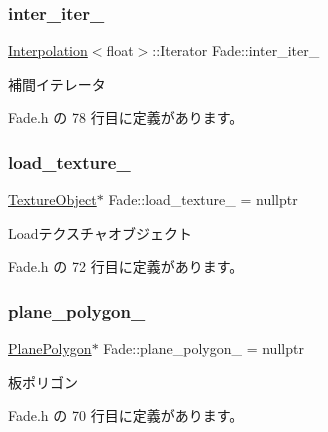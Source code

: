 \subsubsection{\texorpdfstring{inter\+\_\+iter\+\_\+}{inter\_iter\_}}
{\footnotesize\ttfamily \mbox{\hyperlink{class_interpolation}{Interpolation}}$<$float$>$\+::Iterator Fade\+::inter\+\_\+iter\+\_\+\hspace{0.3cm}{\ttfamily [private]}}



補間イテレータ 



 Fade.\+h の 78 行目に定義があります。

\mbox{\label{class_fade_a5bdc7ea6de7666601fa363e503ccc181}} 
\subsubsection{\texorpdfstring{load\+\_\+texture\+\_\+}{load\_texture\_}}
{\footnotesize\ttfamily \mbox{\hyperlink{class_texture_object}{Texture\+Object}}$\ast$ Fade\+::load\+\_\+texture\+\_\+ = nullptr\hspace{0.3cm}{\ttfamily [private]}}



Loadテクスチャオブジェクト 



 Fade.\+h の 72 行目に定義があります。

\mbox{\label{class_fade_ab51b04ff5e6225016ccb012fce80dd74}} 
\subsubsection{\texorpdfstring{plane\+\_\+polygon\+\_\+}{plane\_polygon\_}}
{\footnotesize\ttfamily \mbox{\hyperlink{class_plane_polygon}{Plane\+Polygon}}$\ast$ Fade\+::plane\+\_\+polygon\+\_\+ = nullptr\hspace{0.3cm}{\ttfamily [private]}}



板ポリゴン 



 Fade.\+h の 70 行目に定義があります。


